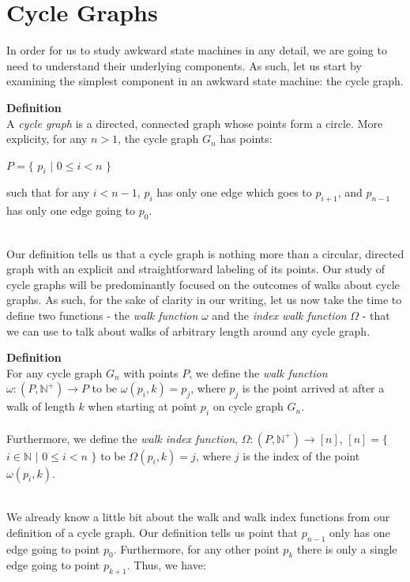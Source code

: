 \documentclass[a4paper,12pt]{article}
\begin{document}
\section{Cycle Graphs}
In order for us to study awkward state machines in any detail, we are going to need to understand their underlying components. As such, let us start by examining the simplest component in an awkward state machine: the cycle graph.
\\
\begin{tcolorbox}
\textbf{Definition}\\
A \textit{cycle graph} is a directed, connected graph whose points form a circle. More explicity, for any $n > 1$, the cycle graph $G_n$ has points:
\begin{center}
$P = \{$ $p_i$ $|$ $0 \leq i < n$ $\}$
\end{center}
such that for any $i < n - 1$, $p_i$ has only one edge which goes to $p_{i + 1}$, and $p_{n-1}$ has only one edge going to $p_0$.
\end{tcolorbox}
\noindent
\\
Our definition tells us that a cycle graph is nothing more than a circular, directed graph with an explicit and straightforward labeling of its points. Our study of cycle graphs will be predominantly focused on the outcomes of walks about cycle graphs. As such, for the sake of clarity in our writing, let us now take the time to define two functions - the \textit{walk function} $\omega$ and the \textit{index walk function} $\Omega$ - that we can use to talk about walks of arbitrary length around any cycle graph.\\
\begin{tcolorbox}
\textbf{Definition}\\
For any cycle graph $G_n$ with points $P$, we define the \textit{walk function} $\omega: (P, \mathbb{N}^{+}) \rightarrow P$ to be $\omega(p_i, k) = p_j$, where $p_j$ is the point arrived at after a walk of length $k$ when starting at point $p_i$ on cycle graph $G_n$.\\
\\
Furthermore, we define the \textit{walk index function}, $\Omega: (P, \mathbb{N}^{+}) \rightarrow [n]$, $[n] = \{$ $i \in \mathbb{N}$ $|$ $0 \leq i < n$ $\}$ to be $\Omega(p_i, k) = j$, where $j$ is the index of the point $\omega(p_i, k)$.
\end{tcolorbox}
\noindent
\\
We already know a little bit about the walk and walk index functions from our definition of a cycle graph. Our definition tells us point that $p_{n-1}$ only has one edge going to point $p_0$. Furthermore, for any other point $p_k$ there is only a single edge going to point $p_{k+1}$. Thus, we have:
\end{document}
